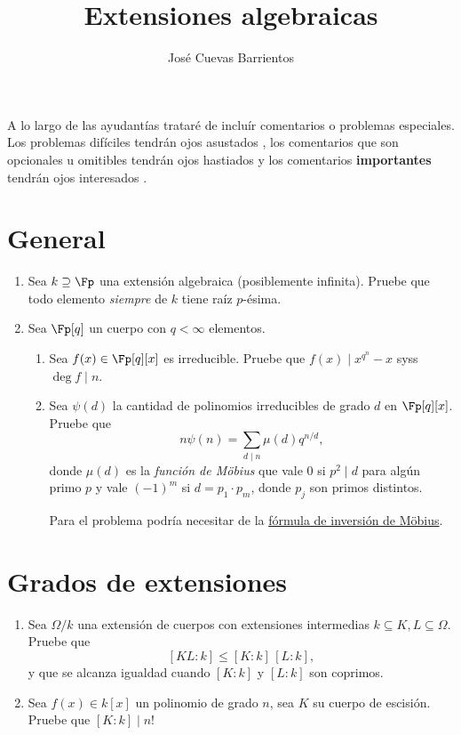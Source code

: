 \documentclass[11pt, reqno]{amsart}
\title{Extensiones algebraicas}
\date{\DTMdate{2025-08-13}}
\author{José Cuevas Barrientos}
\begin{document}
\maketitle

A lo largo de las ayudantías trataré de incluír comentarios o problemas especiales.
Los problemas difíciles tendrán ojos asustados {\straighteyes},
los comentarios que son opcionales u omitibles tendrán ojos hastiados {\upeyes}
y los comentarios \textbf{importantes} tendrán ojos interesados {\righteyes}.

\section{General}
\begin{enumerate}
	\item Sea $k \supseteq \Fp$ una extensión algebraica (posiblemente infinita).
		Pruebe que todo elemento \emph{siempre} de $k$ tiene raíz $p$-ésima.

	\item Sea $\Fp[q]$ un cuerpo con $q < \infty$ elementos.
		\begin{enumerate}
			\item Sea $f(x) \in \Fp[q][x]$ es irreducible.
				Pruebe que $f(x) \mid x^{q^n} - x$ syss $\deg f \mid n$.

			\item Sea $\psi(d)$ la cantidad de polinomios irreducibles de grado $d$ en $\Fp[q][x]$.
				Pruebe que
				\[
					n \psi(n) = \sum_{d \mid n} \mu(d) q^{n/d},
				\]
				donde $\mu(d)$ es la \emph{función de Möbius} que vale 0 si $p^2 \mid d$ para algún primo $p$ y vale
				$(-1)^m$ si $d = p_1\cdot p_m$, donde $p_j$ son primos distintos.

				\begin{hint}
					Para el problema podría necesitar de la \href{https://es.wikipedia.org/wiki/Fórmula_de_inversión_de_Möbius}{fórmula de inversión de Möbius}.
				\end{hint}
		\end{enumerate}
\end{enumerate}

\section{Grados de extensiones}
\begin{enumerate}[resume]
	\item Sea $\Omega/k$ una extensión de cuerpos con extensiones intermedias $k \subseteq K, L \subseteq \Omega$.
		Pruebe que
		\[
			[KL : k] \le [K : k] \, [L : k],
		\]
		y que se alcanza igualdad cuando $[K : k]$ y $[L : k]$ son coprimos.

	\item Sea $f(x) \in k[x]$ un polinomio de grado $n$, sea $K$ su cuerpo de escisión.
		Pruebe que $[K : k] \mid n!$
\end{enumerate}
\end{document}
